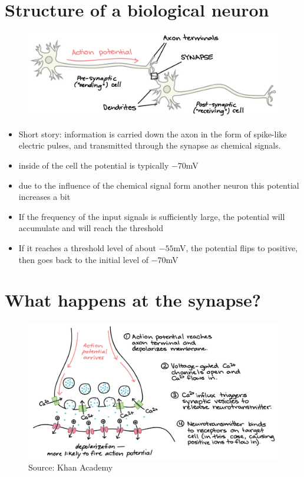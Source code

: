 \documentclass[12pt]{article}
\numberwithin{equation}{section}
\begin{document}
\section*{Structure of a biological neuron}
\begin{figure}[h!]
    \centering
    \includegraphics[scale=1.0]{images/neuron-synapse-2.png}
\end{figure}
\begin{itemize}
    \item Short story: information is carried down the axon in the form of spike-like electric pulses, and 
    transmitted through the synapse as chemical signals.
    \item inside of the cell the potential is typically $-70$mV
    \item due to the influence of the chemical signal form another neuron this potential increases a bit 
    \item If the frequency of the input signals is sufficiently large, the potential will accumulate and will reach the threshold
    \item If it reaches a threshold level of about $-55$mV, the potential flips to positive, then goes back to
    the initial level of $-70$mV
\end{itemize}

\newpage
\section*{What happens at the synapse?}
\begin{figure}[h!]
    \centering
    \includegraphics[height=0.8\textheight]{images/synapse-chemistry.png}
    \caption{Source: Khan Academy \cite{khanacademy_neuron}}
\end{figure}
\end{document}
